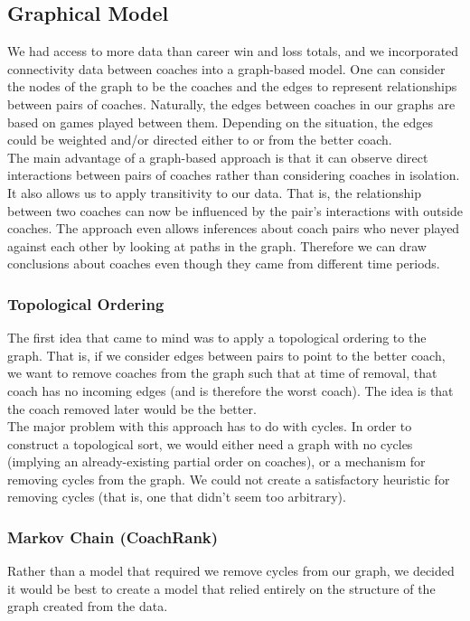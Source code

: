 \documentclass[11pt,notitlepage]{article}
\begin{document}
\subsection{Graphical Model}
We had access to more data than career win and loss totals, and we incorporated connectivity data between coaches into a graph-based model. One can consider the nodes of the graph to be the coaches and the edges to represent relationships between pairs of coaches. Naturally, the edges between coaches in our graphs are based on games played between them. Depending on the situation, the edges could be weighted and/or directed either to or from the better coach.
\\

\noindent The main advantage of a graph-based approach is that it can observe direct interactions between pairs of coaches rather than considering coaches in isolation. It also allows us to apply transitivity to our data. That is, the relationship between two coaches can now be influenced by the pair's interactions with outside coaches. The approach even allows inferences about coach pairs who never played against each other by looking at paths in the graph. Therefore we can draw conclusions about coaches even though they came from different time periods.

\subsubsection{Topological Ordering}
The first idea that came to mind was to apply a topological ordering to the graph. That is, if we consider edges between pairs to point to the better coach, we want to remove coaches from the graph such that at time of removal, that coach has no incoming edges (and is therefore the worst coach). The idea is that the coach removed later would be the better.
\\

\noindent The major problem with this approach has to do with cycles. In order to construct a topological sort, we would either need a graph with no cycles (implying an already-existing partial order on coaches), or a mechanism for removing cycles from the graph. We could not create a satisfactory heuristic for removing cycles (that is, one that didn't seem too arbitrary).

\subsubsection{Markov Chain (CoachRank)}
Rather than a model that required we remove cycles from our graph, we decided it would be best to create a model that relied entirely on the structure of the graph created from the data.
\\
\end{document}

